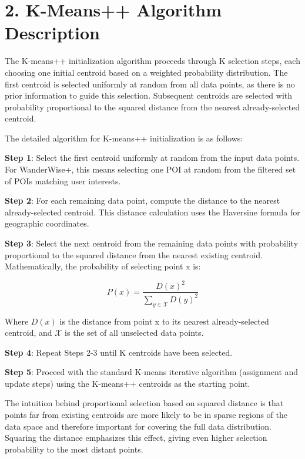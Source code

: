 \section{2. K-Means++ Algorithm Description}

The K-means++ initialization algorithm proceeds through K selection steps, each choosing one initial centroid based on a weighted probability distribution. The first centroid is selected uniformly at random from all data points, as there is no prior information to guide this selection. Subsequent centroids are selected with probability proportional to the squared distance from the nearest already-selected centroid.

The detailed algorithm for K-means++ initialization is as follows:

\textbf{Step 1}: Select the first centroid uniformly at random from the input data points. For WanderWise+, this means selecting one POI at random from the filtered set of POIs matching user interests.

\textbf{Step 2}: For each remaining data point, compute the distance to the nearest already-selected centroid. This distance calculation uses the Haversine formula for geographic coordinates.

\textbf{Step 3}: Select the next centroid from the remaining data points with probability proportional to the squared distance from the nearest existing centroid. Mathematically, the probability of selecting point x is:

\begin{equation}
P(x) = \frac{D(x)^2}{\sum_{y \in \mathcal{X}} D(y)^2}
\end{equation}

Where $D(x)$ is the distance from point x to its nearest already-selected centroid, and $\mathcal{X}$ is the set of all unselected data points.

\textbf{Step 4}: Repeat Steps 2-3 until K centroids have been selected.

\textbf{Step 5}: Proceed with the standard K-means iterative algorithm (assignment and update steps) using the K-means++ centroids as the starting point.

The intuition behind proportional selection based on squared distance is that points far from existing centroids are more likely to be in sparse regions of the data space and therefore important for covering the full data distribution. Squaring the distance emphasizes this effect, giving even higher selection probability to the most distant points.


